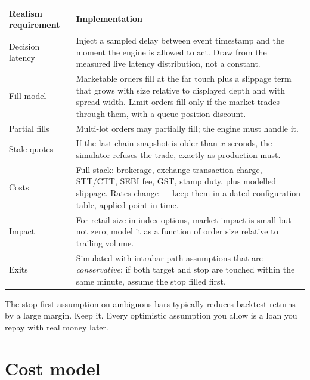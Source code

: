 \begin{longtable}{@{}p{4.0cm}p{10.6cm}@{}}
\toprule
\textbf{Realism requirement} & \textbf{Implementation}\\
\midrule
Decision latency & Inject a sampled delay between event timestamp and the
moment the engine is allowed to act. Draw from the measured live latency
distribution, not a constant.\\
Fill model & Marketable orders fill at the far touch plus a slippage term that
grows with size relative to displayed depth and with spread width. Limit orders
fill only if the market trades through them, with a queue-position discount.\\
Partial fills & Multi-lot orders may partially fill; the engine must handle it.\\
Stale quotes & If the last chain snapshot is older than $x$ seconds, the
simulator refuses the trade, exactly as production must.\\
Costs & Full stack: brokerage, exchange transaction charge, STT/CTT, SEBI fee,
GST, stamp duty, plus modelled slippage. Rates change --- keep them in a dated
configuration table, applied point-in-time.\\
Impact & For retail size in index options, market impact is small but not zero;
model it as a function of order size relative to trailing volume.\\
Exits & Simulated with intrabar path assumptions that are \emph{conservative}:
if both target and stop are touched within the same minute, assume the stop
filled first.\\
\bottomrule
\end{longtable}

\begin{warnbox}[title={The conservative-tie rule}]
The stop-first assumption on ambiguous bars typically reduces backtest returns by
a large margin. Keep it. Every optimistic assumption you allow is a loan you
repay with real money later.
\end{warnbox}

\section{Cost model}

